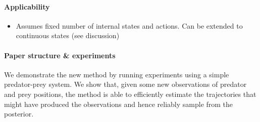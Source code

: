 \paragraph{Applicability}


\begin{itemize}
\item Assumes fixed number of internal states and actions. Can be extended to continuous states (see  discussion)
\end{itemize}

\paragraph{Paper structure \& experiments}

We demonstrate the new method by running experiments using a simple predator-prey system. We show that, given some new observations of predator and prey positions, the method is able to efficiently estimate the trajectories that might have produced the observations and hence reliably sample from the posterior.


